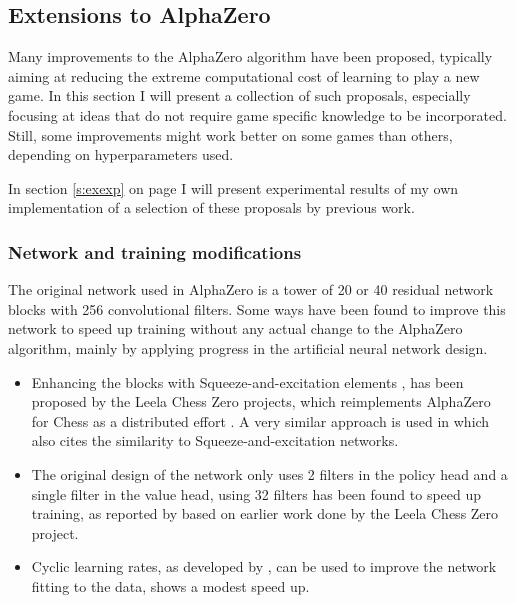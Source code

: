 \documentclass[12pt,onecolumn,oneside,titlepage]{article}
\begin{document}
\subsection{Extensions to AlphaZero} \label{s:prev_extensions}

Many improvements to the AlphaZero algorithm have been proposed, typically aiming at reducing the extreme computational cost of learning to play a new game.
In this section I will present a collection of such proposals, especially focusing at ideas that do not require game specific knowledge to be incorporated. Still, some improvements might work better on some games than others,
depending on hyperparameters used. 

In section \ref{s:exexp} on page \pageref{s:exexp} I will present experimental results of my own implementation of a selection of these proposals by previous work.

\subsubsection{Network and training modifications}

The original network used in AlphaZero is a tower of 20 or 40 residual network blocks with 256 convolutional filters. Some ways have been found to improve this network to speed up training without any actual change to the AlphaZero algorithm, mainly by applying progress in the artificial neural network design.

\begin{itemize}
 \item Enhancing the blocks with Squeeze-and-excitation elements \cite{hu2018squeeze}, has been proposed by the Leela Chess Zero projects, which reimplements AlphaZero for Chess as a distributed effort \cite{leela0sq}.
       A very similar approach is used in \cite{wu2019accelerating} which also cites the similarity to Squeeze-and-excitation networks.
 \item The original design of the network only uses 2 filters in the policy head and a single filter in the value head, using 32 filters has been found to speed up training, as reported by \cite{oracledevs6} based on earlier work done by the Leela Chess Zero project.
 \item Cyclic learning rates, as developed by \cite{smith2017cyclical}, can be used to improve the network fitting to the data, \cite{oracledevs6} shows a modest speed up.
\end{itemize}
\end{document}
